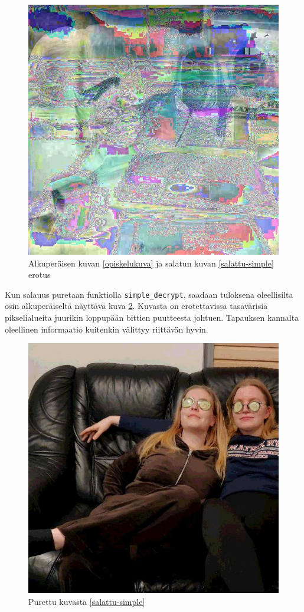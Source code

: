 \documentclass[a4paper,11pt]{article}
\begin{document}
\begin{figure}
    \centering
    \includegraphics[width= 120mm]{kuvat/erotus1.jpg}
    \caption{Alkuperäisen kuvan \ref{opiskelukuva} ja salatun kuvan \ref{salattu-simple} erotus}
    \label{erotus-simple1}
\end{figure}

Kun salauus puretaan funktiolla \texttt{simple\_decrypt}, saadaan tuloksena oleellisilta osin alkuperäiseltä näyttävä kuva \ref{purettu-simple}. Kuvasta on erotettavissa tasavärisiä pikselialueita juurikin loppupään bittien puutteesta johtuen. Tapauksen kannalta oleellinen informaatio kuitenkin välittyy riittävän hyvin.

\begin{figure}
    \centering
    \includegraphics[width= 120mm]{kuvat/purettu1.jpg}
    \caption{Purettu kuvasta \ref{salattu-simple}}
    \label{purettu-simple}
\end{figure}
\end{document}

